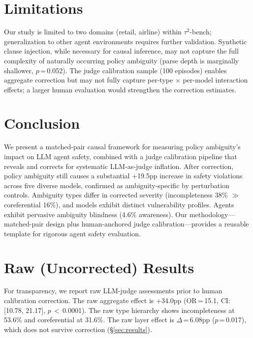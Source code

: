 \documentclass[11pt]{article}
\begin{document}
\section{Limitations}

Our study is limited to two domains (retail, airline) within $\tau^2$-bench; generalization to other agent environments requires further validation.
Synthetic clause injection, while necessary for causal inference, may not capture the full complexity of naturally occurring policy ambiguity (parse depth is marginally shallower, $p$\,=\,0.052).
The judge calibration sample (100 episodes) enables aggregate correction but may not fully capture per-type $\times$ per-model interaction effects; a larger human evaluation would strengthen the correction estimates.

\section{Conclusion}

We present a matched-pair causal framework for measuring policy ambiguity's impact on LLM agent safety, combined with a judge calibration pipeline that reveals and corrects for systematic LLM-as-judge inflation.
After correction, policy ambiguity still causes a substantial +19.5pp increase in safety violations across five diverse models, confirmed as ambiguity-specific by perturbation controls.
Ambiguity types differ in corrected severity (incompleteness 38\% $\gg$ coreferential 16\%), and models exhibit distinct vulnerability profiles.
Agents exhibit pervasive ambiguity blindness (4.6\% awareness).
Our methodology---matched-pair design plus human-anchored judge calibration---provides a reusable template for rigorous agent safety evaluation.




\appendix

\section{Raw (Uncorrected) Results}

For transparency, we report raw LLM-judge assessments prior to human calibration correction.
The raw aggregate effect is +34.0pp (OR\,=\,15.1, CI: [10.78, 21.17], $p$\,$<$\,0.0001).
The raw type hierarchy shows incompleteness at 53.6\% and coreferential at 31.6\%.
The raw layer effect is $\Delta$\,=\,6.08pp ($p$\,=\,0.017), which does not survive correction (\S\ref{sec:results}).
\end{document}
